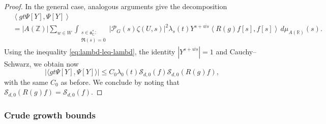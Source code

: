 \documentclass[reqno]{amsart}
\theoremstyle{plain} \newtheorem{theorem} {Theorem}
\theoremstyle{definition} \newtheorem{definition} [theorem] {Definition}
\theoremstyle{itplain} %
\numberwithin{equation}{section}
\numberwithin{theorem}{section}
\renewcommand{\leq}{\leqslant}
\begin{document}
\begin{proof}
  In the general case, analogous arguments give the decomposition
  \begin{align*}
    &\left\langle g t \Psi[Y], \Psi[Y] \right\rangle \\
    &=
    |A(\mathbb{Z})|
    \sum_{w \in W}
    \int _{
      \substack{
        s \in \mathfrak{a}_{\mathbb{C}}^* :  \\
         \Re(s) = 0
      }
    }
    |\mathcal{P}_G(s) \zeta(U,s)|^2
    \lambda_s(t)
    Y^{s + \overline{w s}}
    \left\langle R(g) f[s], f[s] \right\rangle
    \, d \mu_{A(\mathbb{R})}(s).
  \end{align*}
  Using the inequality \eqref{eq:lambd-leq-lambd}, the identity $\left\lvert Y^{s+ \overline{w s}} \right\rvert = 1$ and Cauchy--Schwarz, we obtain now
  \begin{equation*}
    \left\lvert \langle g t \Psi[Y], \Psi[Y] \rangle \right\rvert \leq C_0 \lambda_0(t) \mathcal{S}_{d,0}(f) \mathcal{S}_{d,0}(R(g) f),
  \end{equation*}
  with the same $C_0$ as before.  We conclude by noting that $\mathcal{S}_{d,0}(R(g) f) = \mathcal{S}_{d,0}(f)$.
\end{proof}


\subsubsection{Crude growth bounds}
\end{document}
